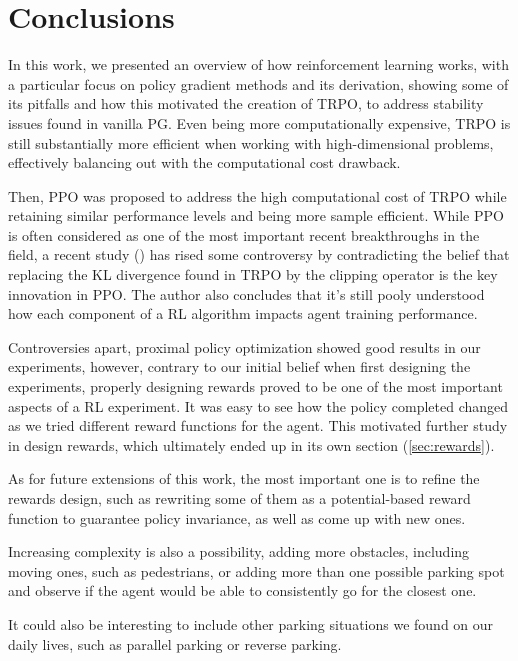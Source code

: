 \chapter{Conclusions}
In this work, we presented an overview of how reinforcement learning works, with a particular focus on policy gradient methods and its derivation, showing some of its pitfalls and how this motivated the creation of TRPO, to address stability issues found in vanilla PG. Even being more computationally expensive, TRPO is still substantially more efficient when working with high-dimensional problems, effectively balancing out with the computational cost drawback.

Then, PPO was proposed to address the high computational cost of TRPO while retaining similar performance levels and being more sample efficient. While PPO is often considered as one of the most important recent breakthroughs in the field, a recent study (\cite{https://doi.org/10.48550/arxiv.2005.12729}) has rised some controversy by contradicting the belief that replacing the KL divergence found in TRPO by the clipping operator is the key innovation in PPO. The author also concludes that it's still pooly understood how each component of a RL algorithm impacts agent training performance.

Controversies apart, proximal policy optimization showed good results in our experiments, however, contrary to our initial belief when first designing the experiments, properly designing rewards proved to be one of the most important aspects of a RL experiment. It was easy to see how the policy completed changed as we tried different reward functions for the agent. This motivated further study in design rewards, which ultimately ended up in its own section (\ref{sec:rewards}).

As for future extensions of this work, the most important one is to refine the rewards design, such as rewriting some of them as a potential-based reward function to guarantee policy invariance, as well as come up with new ones.

Increasing complexity is also a possibility, adding more obstacles, including moving ones, such as pedestrians, or adding more than one possible parking spot and observe if the agent would be able to consistently go for the closest one.

It could also be interesting to include other parking situations we found on our daily lives, such as parallel parking or reverse parking.